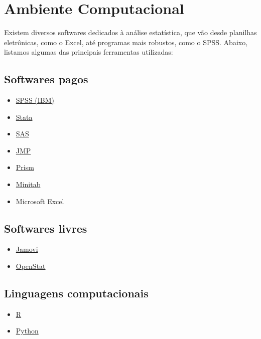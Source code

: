 \documentclass[
]{book}
\providecommand{\tightlist}{%
  \setlength{\itemsep}{0pt}\setlength{\parskip}{0pt}}
\begin{document}
\chapter{Ambiente Computacional}\label{ambiente-computacional}

Existem diversos softwares dedicados à análise estatística, que vão desde planilhas eletrônicas, como o Excel, até programas mais robustos, como o SPSS. Abaixo, listamos algumas das principais ferramentas utilizadas:

\section{Softwares pagos}\label{softwares-pagos}

\begin{itemize}
\tightlist
\item
  \href{https://www.ibm.com/br-pt/spss}{SPSS (IBM)}
\item
  \href{https://www.stata-brasil.com/software/stata.html}{Stata}
\item
  \href{https://www.sas.com/pt_br}{SAS}
\item
  \href{https://www.jmp.com/}{JMP}
\item
  \href{https://software.com.br/p/prism}{Prism}
\item
  \href{https://osbsoftware.com.br/produto/minitab-statistical-software}{Minitab}
\item
  Microsoft Excel
\end{itemize}

\section{Softwares livres}\label{softwares-livres}

\begin{itemize}
\tightlist
\item
  \href{https://www.jamovi.org}{Jamovi}
\item
  \href{https://openstat.info}{OpenStat}
\end{itemize}

\section{Linguagens computacionais}\label{linguagens-computacionais}

\begin{itemize}
\tightlist
\item
  \href{https://www.r-project.org}{R}
\item
  \href{https://www.python.org/}{Python}
\end{itemize}
\end{document}
